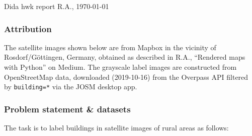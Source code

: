 \documentclass[12pt,a4paper]{article}
\begin{document}
    
    Dida hwk report
    \hfill
    R.A., \today
    
    \subsubsection*{Attribution}
    
    The satellite images shown below are from Mapbox
    in the vicinity of Rosdorf/G\"ottingen, Germany,
    obtained as described in 
    R.A., ``Rendered maps with Python'' on Medium.
    The grayscale label images are constructed 
    from OpenStreetMap data,
    downloaded (2019-10-16) from the Overpass API
    filtered by \texttt{building=*}
    via 
    the JOSM desktop app.
    
    \subsubsection*{Problem statement \& datasets}
    
    The task is to label buildings in satellite images of 
    rural areas as follows:
    
\end{document}
